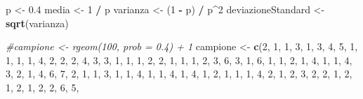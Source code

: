 \documentclass[]{book}
\newenvironment{Shaded}{\begin{snugshade}}{\end{snugshade}}
\newcommand{\KeywordTok}[1]{\textcolor[rgb]{0.13,0.29,0.53}{\textbf{#1}}}
\newcommand{\DecValTok}[1]{\textcolor[rgb]{0.00,0.00,0.81}{#1}}
\newcommand{\FloatTok}[1]{\textcolor[rgb]{0.00,0.00,0.81}{#1}}
\newcommand{\StringTok}[1]{\textcolor[rgb]{0.31,0.60,0.02}{#1}}
\newcommand{\CommentTok}[1]{\textcolor[rgb]{0.56,0.35,0.01}{\textit{#1}}}
\newcommand{\OperatorTok}[1]{\textcolor[rgb]{0.81,0.36,0.00}{\textbf{#1}}}
\newcommand{\NormalTok}[1]{#1}
\begin{document}
\begin{Shaded}
\begin{Highlighting}[]
\NormalTok{p <-}\StringTok{ }\FloatTok{0.4}
\NormalTok{media <-}\StringTok{ }\DecValTok{1} \OperatorTok{/}\StringTok{ }\NormalTok{p}
\NormalTok{varianza <-}\StringTok{ }\NormalTok{(}\DecValTok{1} \OperatorTok{-}\StringTok{ }\NormalTok{p) }\OperatorTok{/}\StringTok{ }\NormalTok{p}\OperatorTok{^}\DecValTok{2}
\NormalTok{deviazioneStandard <-}\StringTok{ }\KeywordTok{sqrt}\NormalTok{(varianza)}

\CommentTok{#campione <- rgeom(100, prob = 0.4) + 1}
\NormalTok{campione <-}\StringTok{ }\KeywordTok{c}\NormalTok{(}\DecValTok{2}\NormalTok{, }\DecValTok{1}\NormalTok{, }\DecValTok{1}\NormalTok{, }\DecValTok{3}\NormalTok{, }\DecValTok{1}\NormalTok{, }\DecValTok{3}\NormalTok{, }\DecValTok{4}\NormalTok{, }\DecValTok{5}\NormalTok{, }\DecValTok{1}\NormalTok{, }\DecValTok{1}\NormalTok{, }\DecValTok{1}\NormalTok{, }\DecValTok{1}\NormalTok{, }\DecValTok{4}\NormalTok{, }\DecValTok{2}\NormalTok{, }\DecValTok{2}\NormalTok{, }\DecValTok{2}\NormalTok{, }\DecValTok{4}\NormalTok{, }\DecValTok{3}\NormalTok{, }\DecValTok{3}\NormalTok{, }\DecValTok{1}\NormalTok{, }
              \DecValTok{1}\NormalTok{, }\DecValTok{1}\NormalTok{, }\DecValTok{2}\NormalTok{, }\DecValTok{2}\NormalTok{, }\DecValTok{1}\NormalTok{, }\DecValTok{1}\NormalTok{, }\DecValTok{1}\NormalTok{, }\DecValTok{2}\NormalTok{, }\DecValTok{3}\NormalTok{, }\DecValTok{6}\NormalTok{, }\DecValTok{3}\NormalTok{, }\DecValTok{1}\NormalTok{, }\DecValTok{6}\NormalTok{, }\DecValTok{1}\NormalTok{, }\DecValTok{1}\NormalTok{, }\DecValTok{2}\NormalTok{, }\DecValTok{1}\NormalTok{, }\DecValTok{4}\NormalTok{, }\DecValTok{1}\NormalTok{, }\DecValTok{1}\NormalTok{, }
              \DecValTok{4}\NormalTok{, }\DecValTok{3}\NormalTok{, }\DecValTok{2}\NormalTok{, }\DecValTok{1}\NormalTok{, }\DecValTok{4}\NormalTok{, }\DecValTok{6}\NormalTok{, }\DecValTok{7}\NormalTok{, }\DecValTok{2}\NormalTok{, }\DecValTok{1}\NormalTok{, }\DecValTok{1}\NormalTok{, }\DecValTok{3}\NormalTok{, }\DecValTok{1}\NormalTok{, }\DecValTok{1}\NormalTok{, }\DecValTok{4}\NormalTok{, }\DecValTok{1}\NormalTok{, }\DecValTok{1}\NormalTok{, }\DecValTok{4}\NormalTok{, }\DecValTok{1}\NormalTok{, }\DecValTok{4}\NormalTok{, }\DecValTok{1}\NormalTok{, }
              \DecValTok{2}\NormalTok{, }\DecValTok{1}\NormalTok{, }\DecValTok{1}\NormalTok{, }\DecValTok{1}\NormalTok{, }\DecValTok{4}\NormalTok{, }\DecValTok{2}\NormalTok{, }\DecValTok{1}\NormalTok{, }\DecValTok{2}\NormalTok{, }\DecValTok{3}\NormalTok{, }\DecValTok{2}\NormalTok{, }\DecValTok{2}\NormalTok{, }\DecValTok{1}\NormalTok{, }\DecValTok{2}\NormalTok{, }\DecValTok{1}\NormalTok{, }\DecValTok{2}\NormalTok{, }\DecValTok{1}\NormalTok{, }\DecValTok{2}\NormalTok{, }\DecValTok{2}\NormalTok{, }\DecValTok{6}\NormalTok{, }\DecValTok{5}\NormalTok{, }

\end{Highlighting}
\end{Shaded}
\end{document}
